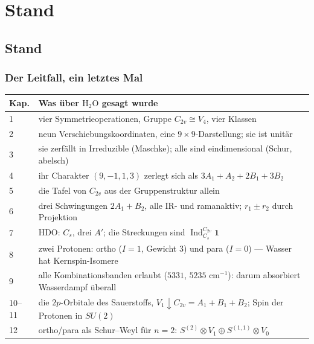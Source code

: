 \part{Stand}

\chapter{Stand}

\section{Der Leitfall, ein letztes Mal}

\begin{merksatz}
\begin{center}
{\small
\renewcommand{\arraystretch}{1.5}
\begin{tabular}{@{}P{1.0cm}P{7.6cm}@{}}
\toprule
\textbf{Kap.} & \textbf{Was über $\mathrm{H_2O}$ gesagt wurde}\\
 & vier Symmetrieoperationen, Gruppe $C_{2v}\cong V_4$, vier Klassen\\
2 & neun Verschiebungskoordinaten, eine $9\times9$-Darstellung; sie ist unitär\\
3 & sie zerfällt in Irreduzible (Maschke); alle sind eindimensional (Schur, abelsch)\\
4 & ihr Charakter $(9, -1, 1, 3)$ zerlegt sich als $3A_1 + A_2 + 2B_1 + 3B_2$\\
5 & die Tafel von $C_{2v}$ aus der Gruppenstruktur allein\\
6 & drei Schwingungen $2A_1 + B_2$, alle IR- und ramanaktiv; $r_1\pm r_2$ durch Projektion\\
7 & $\mathrm{HDO}$: $C_s$, drei $A'$; die Streckungen sind $\operatorname{Ind}^{C_{2v}}_{C_s}\mathbf 1$\\
8 & zwei Protonen: ortho ($I = 1$, Gewicht $3$) und para ($I = 0$) --- Wasser hat Kernspin-Isomere\\
9 & alle Kombinationsbanden erlaubt ($5331$, $5235$ cm$^{-1}$): darum absorbiert Wasserdampf überall\\
10--11 & die $2p$-Orbitale des Sauerstoffs, $V_1\downarrow C_{2v} = A_1 + B_1 + B_2$; Spin der Protonen in $SU(2)$\\
12 & ortho/para als Schur--Weyl für $n = 2$: $S^{(2)}\otimes V_1\oplus S^{(1,1)}\otimes V_0$\\
\bottomrule
\end{tabular}}
\end{center}


\end{merksatz}
